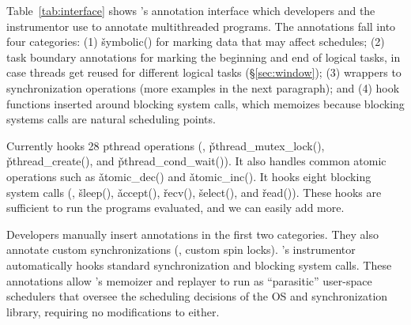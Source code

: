 Table~\ref{tab:interface} shows \tern's annotation interface which
developers and the instrumentor use to annotate multithreaded programs.
The annotations fall into four categories: (1) \v{symbolic()} for marking
data that may affect schedules; (2) task boundary annotations for marking
the beginning and end of logical tasks, in case threads get reused for
different logical tasks (\S\ref{sec:window}); (3) wrappers to
synchronization operations (more examples in the next paragraph); and (4) hook
functions inserted around blocking system calls, which \tern memoizes
because blocking systems calls are natural scheduling points.

Currently \tern hooks 28 pthread operations (\eg, \v{pthread\_mutex\_lock()},
\v{pthread\_create()}, and \v{pthread\_cond\_wait()}).  It also handles
common atomic operations such as \v{atomic\_dec()} and \v{atomic\_inc()}.
It hooks eight blocking system calls (\eg, \v{sleep()}, \v{accept()},
\v{recv()}, \v{select()}, and \v{read()}). These hooks are sufficient to
run the programs evaluated, and we can easily add more.

Developers manually insert annotations in the first two categories.  They
also annotate custom synchronizations (\eg, custom spin locks).  \tern's
instrumentor automatically hooks standard synchronization and blocking
system calls.  These annotations allow \tern's memoizer and replayer to run
as ``parasitic'' user-space schedulers that oversee the scheduling
decisions of the OS and synchronization library, requiring no
modifications to either.











